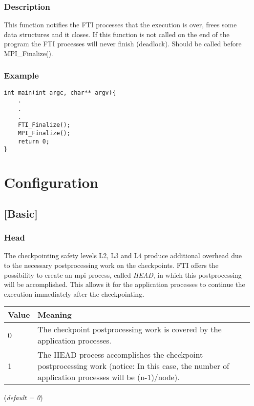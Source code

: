 \documentclass{refrep}
\begin{document}
\subsection*{Description}
This function notifies the FTI processes that the execution is over, frees some data structures and it closes. If this function is not called on the end of the program the FTI processes will never finish (deadlock). Should be called before MPI\_Finalize().
\subsection*{Example}
\begin{center}
\begin{lstlisting}[frame=single]
int main(int argc, char** argv){
    .
    .
    .
    FTI_Finalize();
    MPI_Finalize();
    return 0;
}
\end{lstlisting}
\end{center}
\chapter{Configuration}\label{ch:configuration}
\section{[Basic]}\label{sec:basic}
\subsection{Head}\label{subsec:head}
The checkpointing safety levels L2, L3 and L4 produce additional overhead due to the necessary postprocessing work on the checkpoints. FTI offers the possibility to create an mpi process, called \emph{HEAD}, in which this postprocessing will be accomplished. This allows it for the application processes to continue the execution immediately after the checkpointing.
\begin{center}
\begin{tabular}[h!]{|p{}|p{}|}
\hline
\textbf{Value} & \textbf{Meaning} \\ \hline
0 & The checkpoint postprocessing work is covered by the application processes. \\ \hline
1 & The HEAD process accomplishes the checkpoint postprocessing work (notice: In this case, the number of application processes will be (n-1)/node). \\
\hline
\end{tabular}
\end{center}
(\textit{default = 0})
\end{document}
